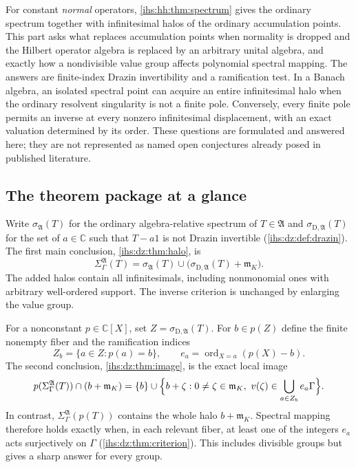 \documentclass[11pt,a4paper]{article}
\numberwithin{equation}{section}
\theoremstyle{definition}
\theoremstyle{remark}
\newcommand{\C}{\mathbb C}
\newcommand{\mK}{\mathfrak m_K}
\newcommand{\Alg}{\mathfrak A}
\newcommand{\SigA}{\Sigma^{\Alg}_\Gamma}
\newcommand{\sigD}{\sigma_{\mathrm D,\Alg}}
\begin{document}
For constant \emph{normal} operators, \cref{ihs:hh:thm:spectrum} gives the
ordinary spectrum together with infinitesimal halos of the ordinary
accumulation points. This part asks what replaces accumulation points when
normality is dropped and the Hilbert operator algebra is replaced by an
arbitrary unital algebra, and exactly how a nondivisible value group affects
polynomial spectral mapping. The answers are finite-index Drazin
invertibility and a ramification test. In a Banach algebra, an isolated
spectral point can acquire
an entire infinitesimal halo when the ordinary resolvent singularity is not a
finite pole. Conversely, every finite pole permits an inverse at every
nonzero infinitesimal displacement, with an exact valuation determined by its
order. These questions are formulated and answered here; they are not
represented as named open conjectures already posed in published literature.

\subsection{The theorem package at a glance}\label{ihs:dz:sec:glance}
Write $\sigma_\Alg(T)$ for the ordinary algebra-relative spectrum of
$T\in\Alg$ and $\sigD(T)$ for the set of $a\in\C$ such that $T-a1$ is not
Drazin invertible (\cref{ihs:dz:def:drazin}). The first main conclusion,
\cref{ihs:dz:thm:halo}, is
\begin{equation}\label{ihs:dz:eq:preview}
 \SigA(T)=\sigma_\Alg(T)\cup\bigl(\sigD(T)+\mK\bigr).
\end{equation}
The added halos contain all infinitesimals, including nonmonomial ones with
arbitrary well-ordered support. The inverse criterion is unchanged by
enlarging the value group.

For a nonconstant $p\in\C[X]$, set $Z=\sigD(T)$. For $b\in p(Z)$ define the
finite nonempty fiber and the ramification indices
\[
 Z_b=\{a\in Z:p(a)=b\},\qquad
 e_a=\operatorname{ord}_{X=a}(p(X)-b).
\]
The second conclusion, \cref{ihs:dz:thm:image}, is the exact local image
\begin{equation}\label{ihs:dz:eq:imagepreview}
 p(\SigA(T))\cap(b+\mK)=\{b\}\cup
 \Bigl\{b+\zeta:0\ne\zeta\in\mK,\ v(\zeta)\in\bigcup_{a\in Z_b}e_a\Gamma\Bigr\}.
\end{equation}
In contrast, $\SigA(p(T))$ contains the whole halo $b+\mK$. Spectral mapping
therefore holds exactly when, in each relevant fiber, at least one of the
integers $e_a$ acts surjectively on $\Gamma$ (\cref{ihs:dz:thm:criterion}).
This includes divisible groups but gives a sharp answer for every group.
\end{document}
